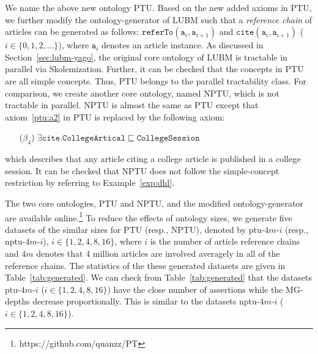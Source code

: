 We name the above new ontology PTU.
Based on the new added axioms in PTU, we further modify the ontology-generator
of LUBM such that a \emph{reference chain} of articles can be generated as follows:
$\texttt{referTo}(\texttt{a}_i,\texttt{a}_{i+1})$ and
$\texttt{cite}(\texttt{a}_i,\texttt{a}_{i+1})$ ($i\in\{0,1,2,...\}$),
where $\texttt{a}_i$ denotes an article instance.
As discussed in Section~\ref{sec:lubm-yago},
the original core ontology of LUBM is tractable in parallel via
Skolemization. Further, it can be checked that the concepts in PTU
are all simple concepts. Thus, PTU belongs to the parallel tractability class.
For comparison, we create another core ontology, named NPTU, which
is not tractable in parallel. NPTU is almost the same as PTU except that
axiom~\ref{ptu:a2} in PTU is replaced by the following axiom:
\begin{enumerate}[leftmargin=8ex]
  \item[($\beta_4$)] $\exists\texttt{cite}.\texttt{CollegeArtical}\sqsubseteq\texttt{CollegeSession}$\label{nptu:a1}
\end{enumerate}
which describes that any article citing a college article is published in a
college session.
It can be checked that NPTU does not follow the simple-concept restriction
by referring to Example~\ref{exp:dhl}.

The two core ontologies, PTU and NPTU,
and the modified ontology-generator are available online.\footnote{https://github.com/quanzz/PT}
To reduce the effects of ontology sizes, we generate five datasets of
the similar sizes for PTU (resp., NPTU), denoted by
ptu-$4m$-$i$ (resp., nptu-$4m$-$i$), $i\in\{1,2,4,8,16\}$,
where $i$ is the number of article reference chains
and $4m$ denotes that 4 million articles are involved averagely in all of the reference chains.
The statistics of the these generated datasets are given in Table~\ref{tab:generated}.
We can check from Table~\ref{tab:generated} that the datasets ptu-$4m$-$i$ ($i\in\{1,2,4,8,16\}$)
have the close number of assertions while the MG-depths decrease proportionally. This is
similar to the datasets nptu-$4m$-$i$ ($i\in\{1,2,4,8,16\}$).

